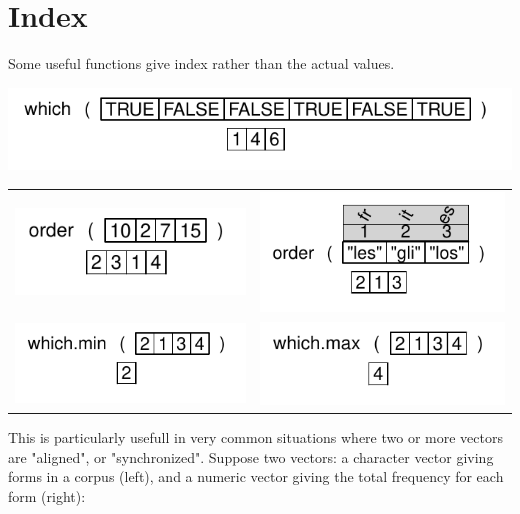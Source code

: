 \documentclass[pdflatex]{article}
\begin{document}
\section{Index}

Some useful functions give index rather than the actual values.

\includegraphics{which}

\begin{tabular}{cc}
\includegraphics{order} & \includegraphics{order2}\\
\includegraphics{which_min} & \includegraphics{which_max}\\
\end{tabular}

This is particularly usefull in very common situations where two or more
vectors are "aligned", or "synchronized". Suppose two vectors: a character
vector giving forms in a corpus (left), and a numeric vector giving the total
frequency for each form (right):
\end{document}
